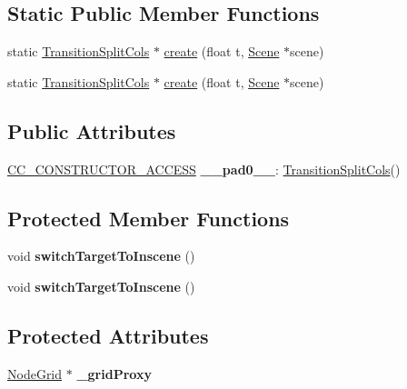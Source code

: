 \subsection*{Static Public Member Functions}
\begin{DoxyCompactItemize}
\item 
static \hyperlink{classTransitionSplitCols}{Transition\+Split\+Cols} $\ast$ \hyperlink{classTransitionSplitCols_a06b99be6e7f74cbe3755366e61f65e28}{create} (float t, \hyperlink{classScene}{Scene} $\ast$scene)
\item 
static \hyperlink{classTransitionSplitCols}{Transition\+Split\+Cols} $\ast$ \hyperlink{classTransitionSplitCols_ab87aa4a19b93706dcd36d9b7c28ac2a7}{create} (float t, \hyperlink{classScene}{Scene} $\ast$scene)
\end{DoxyCompactItemize}
\subsection*{Public Attributes}
\begin{DoxyCompactItemize}
\item 
\mbox{\label{classTransitionSplitCols_a8f6d9ad8fac9be4dd43077addea49198}} 
\hyperlink{_2cocos2d_2cocos_2base_2ccConfig_8h_a25ef1314f97c35a2ed3d029b0ead6da0}{C\+C\+\_\+\+C\+O\+N\+S\+T\+R\+U\+C\+T\+O\+R\+\_\+\+A\+C\+C\+E\+SS} {\bfseries \+\_\+\+\_\+pad0\+\_\+\+\_\+}\+: \hyperlink{classTransitionSplitCols}{Transition\+Split\+Cols}()
\end{DoxyCompactItemize}
\subsection*{Protected Member Functions}
\begin{DoxyCompactItemize}
\item 
\mbox{\label{classTransitionSplitCols_affd522b1eed0e46297d9854ca89e82f1}} 
void {\bfseries switch\+Target\+To\+Inscene} ()
\item 
\mbox{\label{classTransitionSplitCols_affd522b1eed0e46297d9854ca89e82f1}} 
void {\bfseries switch\+Target\+To\+Inscene} ()
\end{DoxyCompactItemize}
\subsection*{Protected Attributes}
\begin{DoxyCompactItemize}
\item 
\mbox{\label{classTransitionSplitCols_a58819ed87c06770ceb13a19e5896b78e}} 
\hyperlink{classNodeGrid}{Node\+Grid} $\ast$ {\bfseries \+\_\+grid\+Proxy}
\end{DoxyCompactItemize}
